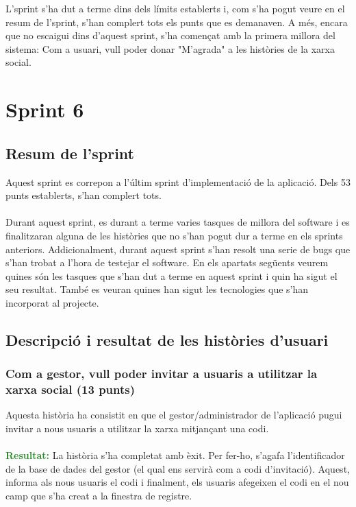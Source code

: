 \documentclass[11pt,catalan,listoffigures,listoftables]{tfgetsinf}
\begin{document}
L'sprint s'ha dut a terme dins dels límits establerts i, com s'ha pogut veure en el resum de l'sprint, s'han complert tots els punts que es demanaven. A més, encara que no escaigui dins d'aquest sprint, s'ha començat amb la primera millora del sistema: Com a usuari, vull poder donar "M'agrada" a les històries de la xarxa social.

\section{Sprint 6}

\subsection{Resum de l'sprint}

Aquest sprint es correpon a l'últim sprint d'implementació de la aplicació. Dels 53 punts establerts, s'han complert tots.\\ \\
Durant aquest sprint, es durant a terme varies tasques de millora del software i es finalitzaran alguna de les històries que no s'han pogut dur a terme en els sprints anteriors. Addicionalment, durant aquest sprint s'han resolt una serie de bugs que s'han trobat a l'hora de testejar el software.
En els apartats següents veurem quines són les tasques que s'han dut a terme en aquest sprint i quin ha sigut el seu resultat. També es veuran quines han sigut les tecnologies que s'han incorporat al projecte.

\subsection{Descripció i resultat de les històries d’usuari}

\subsubsection{Com a gestor, vull poder invitar a usuaris a utilitzar la xarxa social (13 punts)}

Aquesta història ha consistit en que el gestor/administrador de l'aplicació pugui invitar a nous usuaris a utilitzar la xarxa mitjançant una codi.\\ \\
\textcolor{forestgreen}{\textbf{Resultat:}} La història s'ha completat amb èxit. Per fer-ho, s'agafa l'identificador de la base de dades del gestor (el qual ens servirà com a codi d'invitació). Aquest, informa als nous usuaris el codi i finalment, els usuaris afegeixen el codi en el nou camp que s'ha creat a la finestra de registre.
\end{document}
